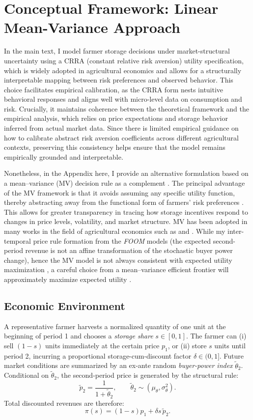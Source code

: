 \section{Conceptual Framework: Linear Mean-Variance Approach} \label{Appendix: mean-variance approach}
\noindent In the main text, I model farmer storage decisions under market-structural uncertainty using a CRRA (constant relative risk aversion) utility specification, which is widely adopted in agricultural economics and allows for a structurally interpretable mapping between risk preferences and observed behavior. This choice facilitates empirical calibration, as the CRRA form nests intuitive behavioral responses and aligns well with micro-level data on consumption and risk. Crucially, it maintains coherence between the theoretical framework and the empirical analysis, which relies on price expectations and storage behavior inferred from actual market data. Since there is limited empirical guidance on how to calibrate abstract risk aversion coefficients across different agricultural contexts, preserving this consistency helps ensure that the model remains empirically grounded and interpretable.

Nonetheless, in the Appendix here, I provide an alternative formulation based on a mean–variance (MV) decision rule as a complement \citep{levy1979approximating, schoemaker1982expected}. The principal advantage of the MV framework is that it avoids assuming any specific utility function, thereby abstracting away from the functional form of farmers’ risk preferences \citep{coyle1992risk}. This allows for greater transparency in tracing how storage incentives respond to changes in price levels, volatility, and market structure. MV has been adopted in many works in the field of agricultural economics such as \cite{saitone2009optimal} and \cite{yu2018effects}. While my inter-temporal price rule formation from the \textit{FOOM} models (the expected second-period revenue is not an affine transformation of the stochastic buyer power change), hence the MV model is not always consistent with expected utility maximization \citep{meyer1987two}, a careful choice from a mean–variance efficient frontier will approximately maximize expected utility \citep{markowitz2014mean, chiu2016supply}.




\subsection{Economic Environment}
\noindent
A representative farmer harvests a normalized quantity of one unit at the beginning of period 1 and chooses a \textit{storage share} \(s\in[0,1]\). The farmer can (i) sell \((1-s)\) units immediately at the certain price \(p_{1}\), or (ii) store \(s\) units until period 2, incurring a proportional storage-cum-discount factor \(\delta\in(0,1]\). Future market conditions are summarized by an ex-ante random \textit{buyer-power index} \(\tilde\theta_{2}\). Conditional on \(\tilde\theta_{2}\), the second-period price is generated by the structural rule:
$$
\tilde p_{2} = \frac{1}{1+\tilde\theta_{2}}, \qquad 
\tilde\theta_{2} \sim (\mu_\theta, \sigma_\theta^{2}).
$$
Total discounted revenues are therefore:
$$
\pi(s) = (1-s)p_{1} + \delta s\,\tilde p_{2}.
$$

